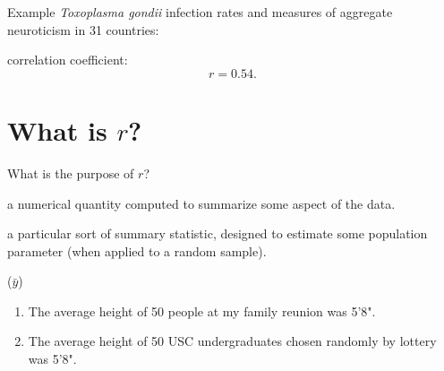 \begin{frame}{Example}
  \textit{Toxoplasma gondii} infection rates and measures of aggregate neuroticism in 31 countries:

    correlation coefficient:
    \[ r = 0.54 .  \]

\end{frame}

\section{What is $r$?}

\begin{frame}{What is the purpose of $r$?}

   a numerical quantity computed to summarize some aspect of the data.

    \vspace{1em}

   a particular sort of summary statistic, designed to estimate some population parameter (when applied to a random sample).

    \vspace{2em}

   ($\bar y$)
  \begin{enumerate}
    \item The average height of 50 people at my family reunion was 5'8".
    \item The average height of 50 USC undergraduates chosen randomly by lottery was 5'8".
  \end{enumerate}

\end{frame}

